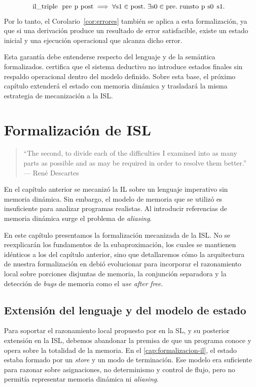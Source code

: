 \documentclass[a4paper,	11pt]{report}
\begin{document}
$$\text{\lstinline|il_triple pre p post|} \implies \forall \text{\lstinline|s1|} \in \text{\lstinline|post|}. \
\exists \text{\lstinline|s0|} \in \text{\lstinline|pre|}. \ \text{\lstinline|runsto p s0 s1|}.$$
Por lo tanto,
el Corolario~\ref{cor:errores} también se aplica a esta formalización,
ya que si una derivación produce un resultado de error satisfacible,
existe un estado inicial y una ejecución operacional que alcanza dicho error.

Esta garantía debe entenderse respecto del lenguaje y de la semántica formalizados.
\fstar{} certifica que el sistema deductivo no introduce estados finales sin respaldo operacional dentro del modelo definido.
Sobre esta base,
el próximo capítulo extenderá el estado con memoria dinámica y trasladará la misma estrategia de mecanización a la ISL.


\chapter{Formalización de ISL}
\label{cap:formalizacion-isl}
\begin{quote}
``The second, to divide each of the difficulties I examined into as many parts as possible and as may be required in order to resolve them better.'' \\
\raggedleft --- René Descartes
\end{quote}

En el capítulo anterior se mecanizó la IL sobre un lenguaje imperativo sin memoria dinámica.
Sin embargo,
el modelo de memoria que se utilizó es insuficiente para analizar programas realistas.
Al introducir referencias de memoria dinámica surge el problema de \emph{aliasing}.

En este capítulo presentamos la formalización mecanizada de la ISL.
No se reexplicarán los fundamentos de la subaproximación,
los cuales se mantienen idénticos a los del capítulo anterior,
sino que detallaremos cómo la arquitectura de nuestra formalización en \fstar{} debió
evolucionar para incorporar el razonamiento local sobre porciones disjuntas de memoria,
la conjunción separadora y la detección de \emph{bugs} de memoria
como el \emph{use after free}.

\section{Extensión del lenguaje y del modelo de estado}
\label{sec:isl-estado}
Para soportar el razonamiento local propuesto por \citet{sl} en la SL,
y su posterior extensión en la ISL,
debemos abandonar la premisa de que un programa conoce y opera sobre la totalidad de la memoria.
En el \autoref{cap:formalizacion-il},
el estado estaba formado por un \emph{store} y un modo de terminación.
Ese modelo era suficiente para razonar sobre asignaciones,
no determinismo y control de flujo,
pero no permitía representar memoria dinámica ni \emph{aliasing}.
\end{document}
